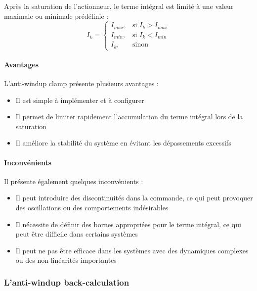 Après la saturation de l'actionneur, le terme intégral est limité à une valeur maximale ou minimale prédéfinie :
\begin{equation}
    I_{k} =
    \begin{cases}
        I_{max}, & \text{si } I_{k} > I_{max} \\
        I_{min}, & \text{si } I_{k} < I_{min} \\
        I_{k}, & \text{sinon}
    \end{cases}
\end{equation}

\paragraph{Avantages}

L'anti-windup clamp présente plusieurs avantages :
\begin{itemize}
    \item Il est simple à implémenter et à configurer
    \item Il permet de limiter rapidement l'accumulation du terme intégral lors de la saturation
    \item Il améliore la stabilité du système en évitant les dépassements excessifs
\end{itemize}

\paragraph{Inconvénients}

Il présente également quelques inconvénients :
\begin{itemize}
    \item Il peut introduire des discontinuités dans la commande, ce qui peut provoquer des oscillations ou des 
    comportements indésirables
    \item Il nécessite de définir des bornes appropriées pour le terme intégral, ce qui peut être difficile dans 
    certains systèmes
    \item Il peut ne pas être efficace dans les systèmes avec des dynamiques complexes ou des non-linéarités 
    importantes
\end{itemize}

\subsubsection{L'anti-windup back-calculation}
\label{sec:anti_windup_back_calculation}

